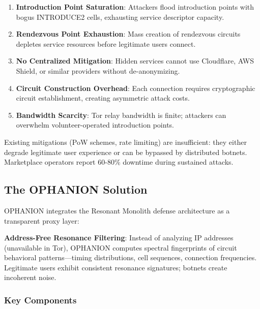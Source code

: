\documentclass[11pt,a4paper]{article}
\begin{document}
\begin{enumerate}[leftmargin=*]
\item \textbf{Introduction Point Saturation}: Attackers flood introduction points with bogus INTRODUCE2 cells, exhausting service descriptor capacity.
\item \textbf{Rendezvous Point Exhaustion}: Mass creation of rendezvous circuits depletes service resources before legitimate users connect.
\item \textbf{No Centralized Mitigation}: Hidden services cannot use Cloudflare, AWS Shield, or similar providers without de-anonymizing.
\item \textbf{Circuit Construction Overhead}: Each connection requires cryptographic circuit establishment, creating asymmetric attack costs.
\item \textbf{Bandwidth Scarcity}: Tor relay bandwidth is finite; attackers can overwhelm volunteer-operated introduction points.
\end{enumerate}

Existing mitigations (PoW schemes, rate limiting) are insufficient: they either degrade legitimate user experience or can be bypassed by distributed botnets. Marketplace operators report 60-80\% downtime during sustained attacks.

\subsection{The OPHANION Solution}

OPHANION integrates the Resonant Monolith defense architecture as a transparent proxy layer:

\begin{tcolorbox}[colback=blue!5!white,colframe=blue!75!black,title=OPHANION Core Innovation]
\textbf{Address-Free Resonance Filtering}: Instead of analyzing IP addresses (unavailable in Tor), OPHANION computes spectral fingerprints of circuit behavioral patterns---timing distributions, cell sequences, connection frequencies. Legitimate users exhibit consistent resonance signatures; botnets create incoherent noise.
\end{tcolorbox}

\subsubsection{Key Components}
\end{document}

